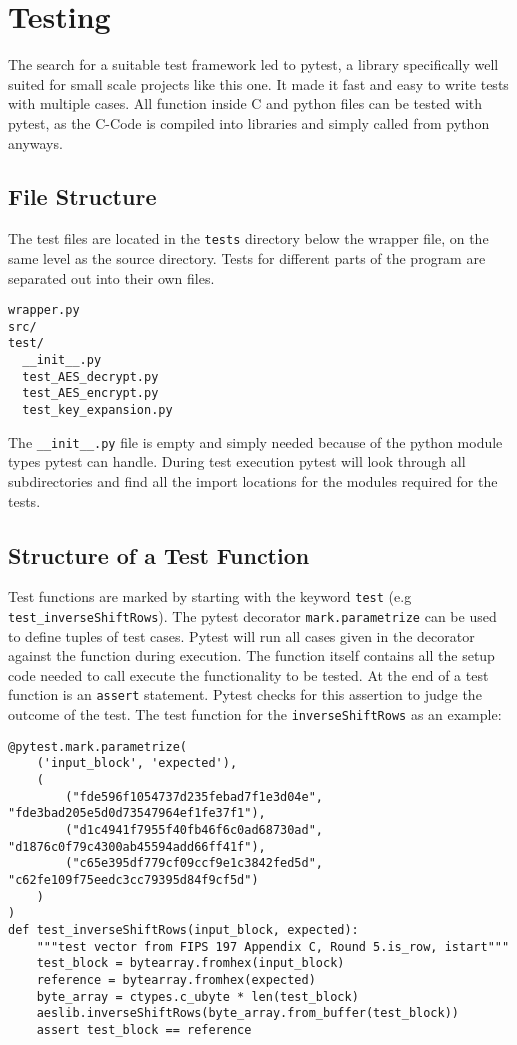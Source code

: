 \section{Testing}
The search for a suitable test framework led to pytest, a library specifically well suited for small scale projects like this one. It made it fast and easy to write tests with multiple cases. All function inside C and python files can be tested with pytest, as the C-Code is compiled into libraries and simply called from python anyways. \cite{pytest}

\subsection{File Structure}
The test files are located in the \lstinline|tests| directory below the wrapper file, on the same level as the source directory. Tests for different parts of the program are separated out into their own files.
\begin{lstlisting}
wrapper.py
src/
test/
  __init__.py
  test_AES_decrypt.py
  test_AES_encrypt.py
  test_key_expansion.py
\end{lstlisting}
The \lstinline|__init__.py| file is empty and simply needed because of the python module types pytest can handle. During test execution pytest will look through all subdirectories and find all the import locations for the modules required for the tests.

\subsection{Structure of a Test Function}
Test functions are marked by starting with the keyword \lstinline|test| (e.g \lstinline|test_inverseShiftRows|). The pytest decorator \lstinline|mark.parametrize| can be used to define tuples of test cases. Pytest will run all cases given in the decorator against the function during execution. The function itself contains all the setup code needed to call execute the functionality to be tested. At the end of a test function is an \lstinline|assert| statement. Pytest checks for this assertion to judge the outcome of the test. The test function for the \lstinline|inverseShiftRows| as an example:
\begin{lstlisting}
@pytest.mark.parametrize(
    ('input_block', 'expected'),
    (
        ("fde596f1054737d235febad7f1e3d04e", "fde3bad205e5d0d73547964ef1fe37f1"),
        ("d1c4941f7955f40fb46f6c0ad68730ad", "d1876c0f79c4300ab45594add66ff41f"),
        ("c65e395df779cf09ccf9e1c3842fed5d", "c62fe109f75eedc3cc79395d84f9cf5d")
    )
)
def test_inverseShiftRows(input_block, expected):
    """test vector from FIPS 197 Appendix C, Round 5.is_row, istart"""
    test_block = bytearray.fromhex(input_block)
    reference = bytearray.fromhex(expected)
    byte_array = ctypes.c_ubyte * len(test_block)
    aeslib.inverseShiftRows(byte_array.from_buffer(test_block))
    assert test_block == reference
\end{lstlisting}


